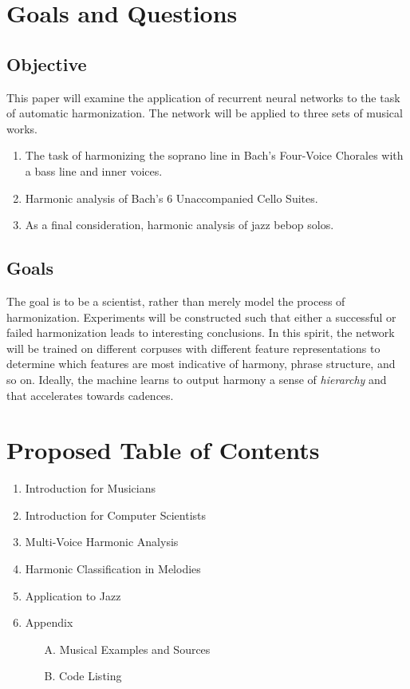 \documentclass[11pt]{article}
\begin{document}
\section{Goals and Questions}

\subsection{Objective}

This paper will examine the application of recurrent neural networks to the task of automatic harmonization. The network will be applied to three sets of musical works. 

\begin{enumerate}
\item The task of harmonizing the soprano line in Bach's Four-Voice Chorales with a bass line and inner voices.
\item Harmonic analysis of Bach's 6 Unaccompanied Cello Suites.
\item As a final consideration, harmonic analysis of jazz bebop solos.
\end{enumerate}

\subsection{Goals}

The goal is to be a scientist, rather than merely model the process of harmonization. Experiments will be constructed such that either a successful or failed harmonization leads to interesting conclusions. In this spirit, the network will be trained on different corpuses with different feature representations to determine which features are most indicative of harmony, phrase structure, and so on. Ideally, the machine learns to output harmony a sense of \textit{hierarchy} and that accelerates towards cadences.

\section{Proposed Table of Contents}

\begin{enumerate}
\item Introduction for Musicians
\item Introduction for Computer Scientists
\item Multi-Voice Harmonic Analysis
\item Harmonic Classification in Melodies
\item Application to Jazz
\item Appendix
	\begin{enumerate}
	\item[A.] Musical Examples and Sources
	\item[B.] Code Listing \\
	\end{enumerate}
\end{enumerate}
\end{document}
